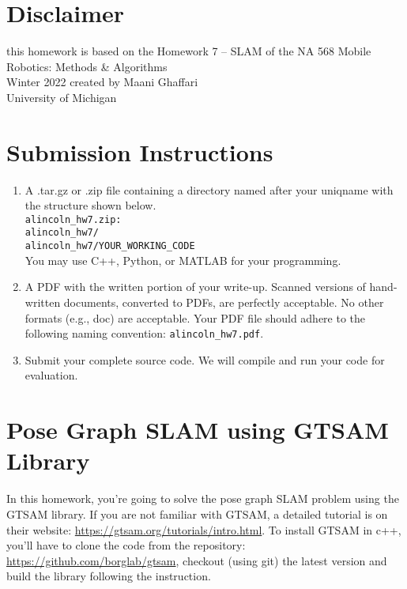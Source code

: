 \documentclass[tp]{lcc}
\begin{document}
\maketitle


\section{Disclaimer}
this homework is based on the Homework 7 -- SLAM of the NA 568 Mobile Robotics: Methods \& Algorithms \\ Winter 2022 created by Maani Ghaffari \\ University of Michigan

\section*{Submission Instructions}

\begin{enumerate}
    \item A .tar.gz or .zip file containing a directory named after your uniqname with the structure shown below. \\
    \texttt{alincoln\_hw7.zip:} \\
    \texttt{alincoln\_hw7/} \\
    \texttt{alincoln\_hw7/YOUR\_WORKING\_CODE} \\
    You may use C++, Python, or MATLAB for your programming.

    \item A PDF with the written portion of your write-up. Scanned versions of hand-written documents, converted to PDFs, are perfectly acceptable. No other formats (e.g., doc) are acceptable. Your PDF file should adhere to the following naming convention: \texttt{alincoln\_hw7.pdf}.

    \item Submit your complete source code. We will compile and run your code for evaluation.
\end{enumerate}

\section{Pose Graph SLAM using GTSAM Library}
In this homework, you’re going to solve the pose graph SLAM problem using the GTSAM library. If you are not familiar with GTSAM, a detailed tutorial is on their website: \url{https://gtsam.org/tutorials/intro.html}. To install GTSAM in c++, you’ll have to clone the code from the repository: \url{https://github.com/borglab/gtsam}, checkout (using git) the latest version and build the library following the instruction.
\end{document}
